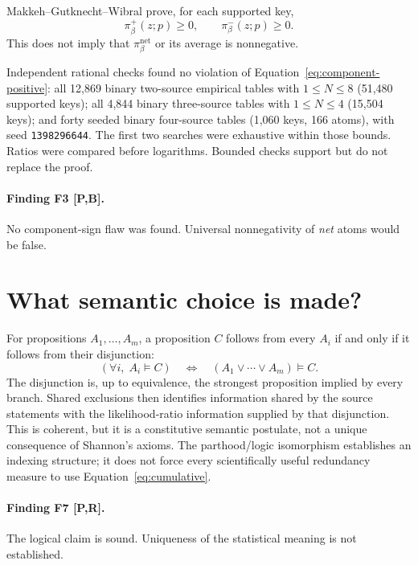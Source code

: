 \documentclass[11pt]{article}
\newcommand{\evidence}[1]{\textbf{[#1]}}
\begin{document}
Makkeh--Gutknecht--Wibral prove, for each supported key,
\begin{equation}
\pi_\beta^+(z;p)\geq0,
\qquad
\pi_\beta^-(z;p)\geq0.
\label{eq:component-positive}
\end{equation}
This does not imply that $\pi_\beta^{\mathrm{net}}$ or its average is
nonnegative.

Independent rational checks found no violation of
Equation~\eqref{eq:component-positive}: all 12,869 binary two-source empirical
tables with $1\leq N\leq8$ (51,480 supported keys); all 4,844 binary
three-source tables with $1\leq N\leq4$ (15,504 keys); and forty seeded binary
four-source tables (1,060 keys, 166 atoms), with seed \texttt{1398296644}.
The first two searches were exhaustive within those bounds.  Ratios were
compared before logarithms.  Bounded checks support but do not replace the
proof.

\paragraph{Finding F3 \evidence{P,B}.}
No component-sign flaw was found.  Universal nonnegativity of \emph{net} atoms
would be false.

\section{What semantic choice is made?}

For propositions $A_1,\ldots,A_m$, a proposition $C$ follows from every $A_i$
if and only if it follows from their disjunction:
\begin{equation}
(\forall i,\;A_i\models C)
\quad\Longleftrightarrow\quad
(A_1\lor\cdots\lor A_m)\models C.
\label{eq:logic}
\end{equation}
The disjunction is, up to equivalence, the strongest proposition implied by
every branch.  Shared exclusions then identifies information shared by the
source statements with the likelihood-ratio information supplied by that
disjunction.  This is coherent, but it is a constitutive semantic postulate,
not a unique consequence of Shannon's axioms.  The parthood/logic isomorphism
establishes an indexing structure; it does not force every scientifically
useful redundancy measure to use Equation~\eqref{eq:cumulative}.

\paragraph{Finding F7 \evidence{P,R}.}
The logical claim is sound.  Uniqueness of the statistical meaning is not
established.
\end{document}
